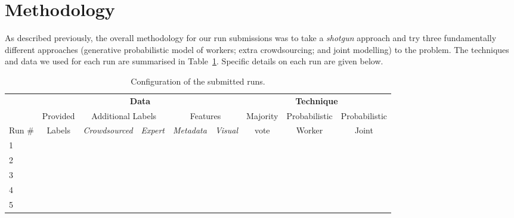 \documentclass{../acm_proc_article-me11_tweaked}
\begin{document}
\section{Methodology}
As described previously, the overall methodology for our run submissions was to take a \emph{shotgun} approach and try three fundamentally different approaches (generative probabilistic model of workers; extra crowdsourcing; and joint modelling) to the problem. The techniques and data we used for each run are summarised in Table~\ref{tab:config}. Specific details on each run are given below.

\begin{table}[t]
	\centering
	\caption{\label{tab:config}Configuration of the submitted runs.}
	\begin{tabular}{|l||c|c|c|c|c||c|c|c|}
		\hline	
		& \multicolumn{5}{c||}{\textbf{Data}} & \multicolumn{3}{c|}{\textbf{Technique}}\\
		\cline{2-9}
	& Provided & \multicolumn{2}{c|}{Additional Labels} & \multicolumn{2}{c||}{Features} & Majority & Probabilistic & Probabilistic\\
	\cline{3-6}
	Run \# & Labels & \emph{Crowdsourced} & \emph{Expert} & \emph{Metadata} & \emph{Visual} & vote & Worker & Joint\\
	
	\hline\hline
	1 & \checkmark & & & & & & \checkmark & \\ \hline
	2 & \checkmark & \checkmark & \checkmark & & & \checkmark & & \\ \hline
	3 & \checkmark & \checkmark & \checkmark & & & & \checkmark & \\ \hline
	4 & \checkmark & \checkmark & \checkmark & \checkmark & & & & \checkmark \\ \hline
	5 & \checkmark & \checkmark & \checkmark & \checkmark & \checkmark & & &\checkmark \\ \hline
	\end{tabular}
\end{table}

\newpage
\end{document}
